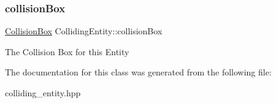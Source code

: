 \subsubsection{\texorpdfstring{collisionBox}{collisionBox}}
{\footnotesize\ttfamily \mbox{\hyperlink{class_collision_box}{Collision\+Box}} Colliding\+Entity\+::collision\+Box\hspace{0.3cm}{\ttfamily [protected]}}

The Collision Box for this Entity 

The documentation for this class was generated from the following file\+:\begin{DoxyCompactItemize}
\item 
colliding\+\_\+entity.\+hpp\end{DoxyCompactItemize}
